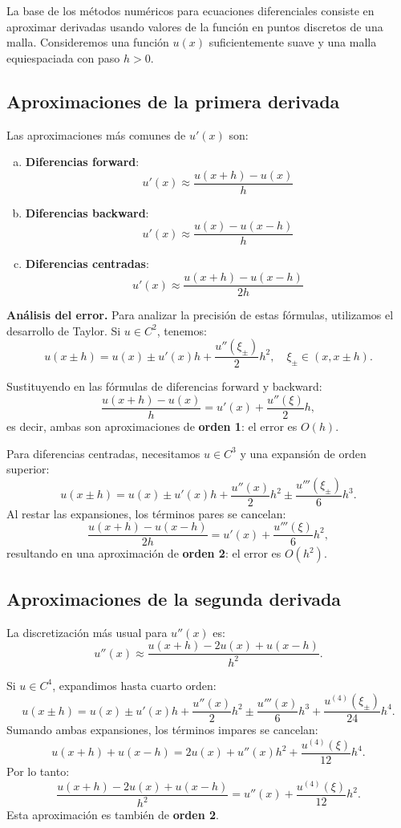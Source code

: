 \documentclass[a4paper,11pt]{report}
\begin{document}
La base de los métodos numéricos para ecuaciones diferenciales consiste en aproximar derivadas usando valores de la función en puntos discretos de una malla. Consideremos una función $u(x)$ suficientemente suave y una malla equiespaciada con paso $h > 0$.

\subsection{Aproximaciones de la primera derivada}

Las aproximaciones más comunes de $u'(x)$ son:

\begin{enumerate}[(a)]
\item \textbf{Diferencias forward}: 
\[
u'(x) \approx \frac{u(x+h) - u(x)}{h}
\]
\item \textbf{Diferencias backward}: 
\[
u'(x) \approx \frac{u(x) - u(x-h)}{h}
\]
\item \textbf{Diferencias centradas}: 
\[
u'(x) \approx \frac{u(x+h) - u(x-h)}{2h}
\]
\end{enumerate}

\textbf{Análisis del error.} Para analizar la precisión de estas fórmulas, utilizamos el desarrollo de Taylor. Si $u \in C^2$, tenemos:
\[
u(x \pm h) = u(x) \pm u'(x)h + \frac{u''(\xi_\pm)}{2} h^2, \quad \xi_\pm \in (x, x \pm h).
\]

Sustituyendo en las fórmulas de diferencias forward y backward:
\[
\frac{u(x+h) - u(x)}{h} = u'(x) + \frac{u''(\xi)}{2} h,
\]
es decir, ambas son aproximaciones de \textbf{orden 1}: el error es $O(h)$.

Para diferencias centradas, necesitamos $u \in C^3$ y una expansión de orden superior:
\[
u(x \pm h) = u(x) \pm u'(x)h + \frac{u''(x)}{2} h^2 \pm \frac{u'''(\xi_\pm)}{6} h^3.
\]
Al restar las expansiones, los términos pares se cancelan:
\[
\frac{u(x+h) - u(x-h)}{2h} = u'(x) + \frac{u'''(\xi)}{6} h^2,
\]
resultando en una aproximación de \textbf{orden 2}: el error es $O(h^2)$.

\subsection{Aproximaciones de la segunda derivada}

La discretización más usual para $u''(x)$ es:
\[
u''(x) \approx \frac{u(x+h) - 2u(x) + u(x-h)}{h^2}.
\]

Si $u \in C^4$, expandimos hasta cuarto orden:
\[
u(x \pm h) = u(x) \pm u'(x)h + \frac{u''(x)}{2} h^2 \pm \frac{u'''(x)}{6} h^3 + \frac{u^{(4)}(\xi_\pm)}{24} h^4.
\]
Sumando ambas expansiones, los términos impares se cancelan:
\[
u(x+h) + u(x-h) = 2u(x) + u''(x)h^2 + \frac{u^{(4)}(\xi)}{12} h^4.
\]
Por lo tanto:
\[
\frac{u(x+h) - 2u(x) + u(x-h)}{h^2} = u''(x) + \frac{u^{(4)}(\xi)}{12} h^2.
\]
Esta aproximación es también de \textbf{orden 2}.
\end{document}
